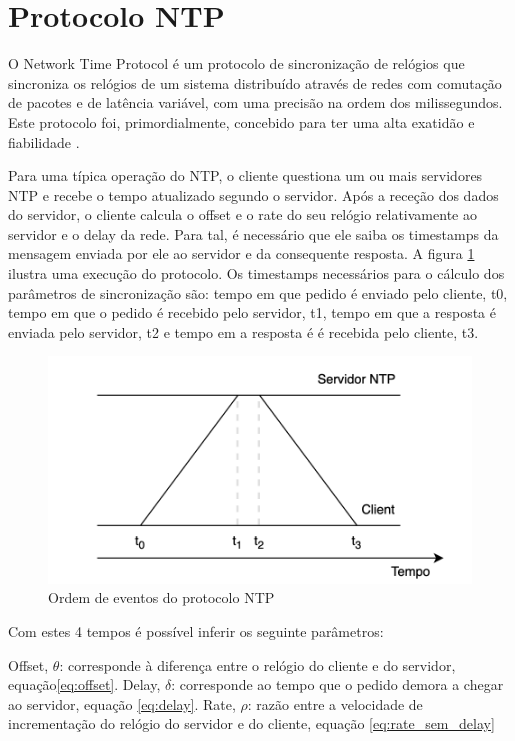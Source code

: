 \section{Protocolo NTP}
\label{sec:NTP}

O Network Time Protocol é um protocolo de sincronização de relógios que sincroniza os relógios de um sistema distribuído através de redes com comutação de pacotes e de latência variável, com uma precisão na ordem dos milissegundos. Este protocolo foi, primordialmente, concebido para ter uma alta exatidão e fiabilidade \cite{b2}.

Para uma típica operação do NTP, o cliente questiona um ou mais servidores NTP e recebe o tempo atualizado segundo o servidor. Após a receção dos dados do servidor, o cliente calcula o offset e o rate do seu relógio relativamente ao servidor e o delay da rede. Para tal, é necessário que ele saiba os timestamps da mensagem enviada por ele ao servidor e da consequente resposta. A figura \ref{fig:diagramaNTP} ilustra uma execução do protocolo. Os timestamps necessários para o cálculo dos parâmetros de sincronização são: tempo em que pedido é enviado pelo cliente, t0, tempo em que o pedido é recebido pelo servidor, t1, tempo em que a resposta é enviada pelo servidor, t2 e tempo em a resposta é é recebida pelo cliente, t3.

    \begin{figure}[h]
        \centering
        \includegraphics[width=0.8\linewidth]{figures/diagramaNTP.png}
        \caption{Ordem de eventos do protocolo NTP}
        \label{fig:diagramaNTP}
    \end{figure}

Com estes 4 tempos é possível inferir os seguinte parâmetros:
\begin{outline}
    \1 Offset, $\theta$:  corresponde à diferença entre o relógio do cliente e do servidor, equação\ref{eq:offset}.
    \1 Delay, $\delta$: corresponde ao tempo que o pedido demora a chegar ao servidor, equação \ref{eq:delay}.
    \1 Rate, $\rho$: razão entre a velocidade de incrementação do relógio do servidor e do cliente, equação \ref{eq:rate_sem_delay}
\end{outline}


